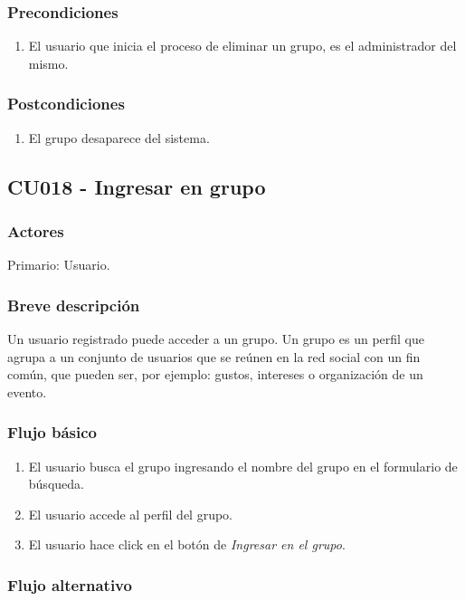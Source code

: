 \documentclass[12pt, a4paper, titlepage]{article}
\begin{document}
\subsubsection{Precondiciones}
	\begin{enumerate}
		\item El usuario que inicia el proceso de eliminar un grupo, es el administrador del mismo.
	\end{enumerate}
\subsubsection{Postcondiciones}
	\begin{enumerate}
		\item El grupo desaparece del sistema.
	\end{enumerate}


\subsection{CU018 - Ingresar en grupo}
\subsubsection{Actores}
Primario: Usuario.
\subsubsection{Breve descripción}
 Un usuario registrado puede acceder a un grupo. Un grupo es un perfil  que agrupa a un conjunto de usuarios que se reúnen en la red social con un fin común, que pueden ser, por ejemplo: gustos, intereses o organización de un evento.

\subsubsection{Flujo básico}
	\begin{enumerate}
		\item El usuario busca el grupo ingresando el nombre del grupo en el formulario de búsqueda.
		\item El usuario accede al perfil del grupo.
		\item El usuario hace click en el botón de \textit{Ingresar en el grupo}.
	\end{enumerate}
\subsubsection{Flujo alternativo}
\end{document}
